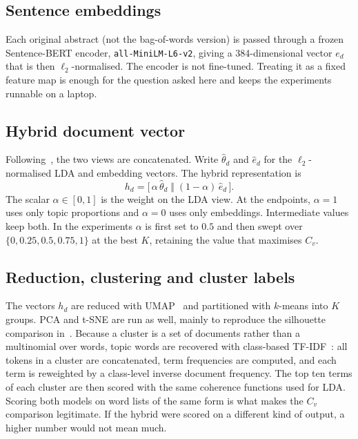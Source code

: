 \documentclass[11pt,a4paper]{article}
\begin{document}
\subsection{Sentence embeddings}
Each original abstract (not the bag-of-words version) is passed through a frozen Sentence-BERT encoder, \texttt{all-MiniLM-L6-v2}, giving a 384-dimensional vector $e_d$ that is then $\ell_2$-normalised. The encoder is not fine-tuned. Treating it as a fixed feature map is enough for the question asked here and keeps the experiments runnable on a laptop.

\subsection{Hybrid document vector}
Following~\cite{paul2025,george2023}, the two views are concatenated. Write $\hat\theta_d$ and $\hat e_d$ for the $\ell_2$-normalised LDA and embedding vectors. The hybrid representation is
\begin{equation}
\label{eq:hybrid}
  h_d = \big[\, \alpha\,\hat\theta_d \;\Vert\; (1-\alpha)\,\hat e_d \,\big].
\end{equation}
The scalar $\alpha\in[0,1]$ is the weight on the LDA view. At the endpoints, $\alpha=1$ uses only topic proportions and $\alpha=0$ uses only embeddings. Intermediate values keep both. In the experiments $\alpha$ is first set to $0.5$ and then swept over $\{0, 0.25, 0.5, 0.75, 1\}$ at the best $K$, retaining the value that maximises $C_v$.

\subsection{Reduction, clustering and cluster labels}
The vectors $h_d$ are reduced with UMAP~\cite{mcinnes2018} and partitioned with $k$-means into $K$ groups. PCA and t-SNE are run as well, mainly to reproduce the silhouette comparison in~\cite{george2023}. Because a cluster is a set of documents rather than a multinomial over words, topic words are recovered with class-based TF-IDF~\cite{grootendorst2022}: all tokens in a cluster are concatenated, term frequencies are computed, and each term is reweighted by a class-level inverse document frequency. The top ten terms of each cluster are then scored with the same coherence functions used for LDA. Scoring both models on word lists of the same form is what makes the $C_v$ comparison legitimate. If the hybrid were scored on a different kind of output, a higher number would not mean much.
\end{document}
